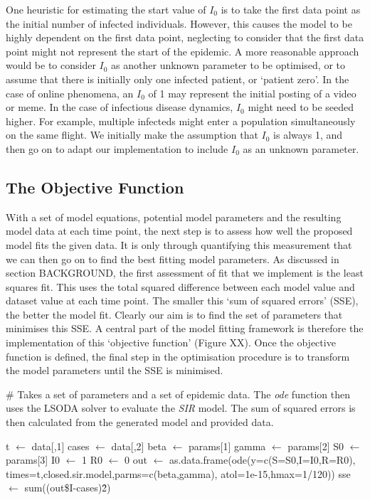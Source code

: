One heuristic for estimating the start value of $I_0$ is to take the
first data point as the initial number of infected
individuals. However, this causes the model to be highly dependent on
the first data point, neglecting to consider that the first data point
might not represent the start of the epidemic. A more reasonable
approach would be to consider $I_0$ as another unknown parameter to be
optimised, or to assume that there is initially only one infected
patient, or `patient zero'. In the case of online phenomena, an $I_0$
of 1 may represent the initial posting of a video or meme. In the case
of infectious disease dynamics, $I_0$ might need to be seeded
higher. For example, multiple infecteds might enter a population
simultaneously on the same flight. We initially make the assumption
that $I_0$ is always 1, and then go on to adapt our
implementation to include $I_0$ as an unknown parameter.


\subsection{The Objective Function}
With a set of model equations, potential model parameters and the
resulting model data at each time point, the next step is to assess
how well the proposed model fits the given data. It is only through
quantifying this measurement that we can then go on to find the best
fitting model parameters. As discussed in section BACKGROUND, the
first assessment of fit that we implement is the least squares
fit. This uses the total squared difference between each model
value and dataset value at each time point. The smaller this `sum of
squared errors' (SSE), the better the model fit. Clearly our aim is to find
the set of parameters that minimises this SSE. A central part of the
model fitting framework is therefore the implementation of this
`objective function' (Figure XX). Once the objective function is
defined, the final step in the optimisation procedure is to transform
the model parameters until the SSE is minimised.

\begin{algorithm}
\begin{algorithmic}
  
  \State \# Takes a set of parameters and a set of
  epidemic data. The \emph{ode} function then uses the LSODA solver to
  evaluate the \emph{SIR} model. The sum of squared
  errors is then calculated from the generated model and provided data.
  \State

  \State t $\gets$ data[,1]
  \State cases $\gets$ data[,2]
  \State
  \State beta $\gets$ params[1]
  \State gamma $\gets$ params[2]
  \State
  \State S0 $\gets$ params[3]
  \State I0 $\gets$ 1
  \State R0 $\gets$ 0
  \State
  \State out $\gets$ as.data.frame(ode(y=c(S=S0,I=I0,R=R0),
  times=t,closed.sir.model,parms=c(beta,gamma),
  atol=1e-15,hmax=1/120))
  \State sse $\gets$ sum((out\$I-cases)\^2)
  \EndFunction
 \end{algorithmic}
\end{algorithm}


